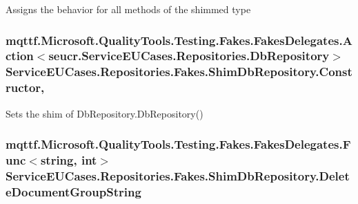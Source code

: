 Assigns the behavior for all methods of the shimmed type

\hypertarget{class_service_e_u_cases_1_1_repositories_1_1_fakes_1_1_shim_db_repository_a2d111e00d9019c70287f42375dd1d1ce}{
\subsubsection[{Constructor}]{\setlength{\rightskip}{0pt plus 5cm}mqttf.\-Microsoft.\-Quality\-Tools.\-Testing.\-Fakes.\-Fakes\-Delegates.\-Action$<$seucr.\-Service\-E\-U\-Cases.\-Repositories.\-Db\-Repository$>$ Service\-E\-U\-Cases.\-Repositories.\-Fakes.\-Shim\-Db\-Repository.\-Constructor\hspace{0.3cm}{\ttfamily [static]}, {\ttfamily [set]}}}\label{class_service_e_u_cases_1_1_repositories_1_1_fakes_1_1_shim_db_repository_a2d111e00d9019c70287f42375dd1d1ce}


Sets the shim of Db\-Repository.\-Db\-Repository()

\hypertarget{class_service_e_u_cases_1_1_repositories_1_1_fakes_1_1_shim_db_repository_a9de2653cfad445d26a66b4d71990c707}{
\subsubsection[{Delete\-Document\-Group\-String}]{\setlength{\rightskip}{0pt plus 5cm}mqttf.\-Microsoft.\-Quality\-Tools.\-Testing.\-Fakes.\-Fakes\-Delegates.\-Func$<$string, int$>$ Service\-E\-U\-Cases.\-Repositories.\-Fakes.\-Shim\-Db\-Repository.\-Delete\-Document\-Group\-String\hspace{0.3cm}{\ttfamily [set]}}}\label{class_service_e_u_cases_1_1_repositories_1_1_fakes_1_1_shim_db_repository_a9de2653cfad445d26a66b4d71990c707}


